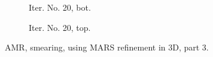 \documentclass[a4paper,12pt]{amsart}
\numberwithin{equation}{section}
\begin{document}
\begin{figure}[h!]
\centering
\begin{subfigure}[t]{0.49\textwidth}
    \caption{Iter. No. 20, bot.}
\end{subfigure}
	\hfill
\begin{subfigure}[t]{0.49\textwidth}
    \caption{Iter. No. 20, top.}
\end{subfigure}

\caption{AMR, smearing, using MARS refinement in 3D, part 3.}
\label{fig:amr_trans3D_pv_mars_topbot_part3}
\end{figure}
\end{document}
